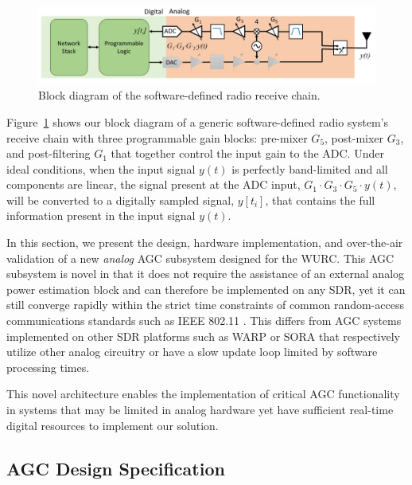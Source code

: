 \begin{figure}[t] %
\centering
\includegraphics[width=1\linewidth]{./figs/agc/agc_rx_diagram}
\caption{Block diagram of the software-defined radio receive chain.}
\label{fig_sdr_ideal_rx}
\end{figure}

Figure~\ref{fig_sdr_ideal_rx} shows our block diagram of a generic software-defined radio system's receive chain with three programmable gain blocks: pre-mixer $G_5$, post-mixer $G_3$, and post-filtering $G_1$ that together control the input gain to the \ac{ADC}.
Under ideal conditions, when the input signal $y(t)$  is perfectly band-limited and all components are linear, the signal present at the \ac{ADC} input, $G_1\cdot G_3\cdot G_5\cdot y(t)$, will be converted to a digitally sampled signal, $y[t_i]$, that contains the full information present in the input signal $y(t)$.

In this section, we present the design, hardware implementation, and over-the-air validation of a new \emph{analog} \ac{AGC} subsystem designed for the \ac{WURC}.
This \ac{AGC} subsystem is novel in that it does not require the assistance of an external analog power estimation block and can therefore be implemented on any \ac{SDR}, yet it can still converge rapidly within the strict time constraints of common random-access communications standards such as IEEE 802.11 \cite{std11_2012}.
This differs from \ac{AGC} systems implemented on other \ac{SDR} platforms such as WARP \cite{middleton2007agc, warp} or SORA \cite{sora} that respectively utilize other analog circuitry or have a slow update loop limited by software processing times.

This novel architecture enables the implementation of critical \ac{AGC} functionality in systems that may be limited in analog hardware yet have sufficient real-time digital resources to implement our solution.

\subsection{AGC Design Specification}


